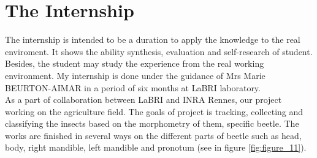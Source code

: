 \section{The Internship}
The internship is intended to be a duration to apply the knowledge to the real enviroment. It shows the ability synthesis, evaluation and self-research of student. Besides, the student may study the experience from the real working environment. My internship is done under the guidance of Mrs Marie BEURTON-AIMAR in a period of six months at LaBRI laboratory.\\[0.2cm]
As a part of collaboration between LaBRI and INRA Rennes, our project working on the agriculture field. The goals of project is tracking, collecting and classifying the insects based on the morphometry of them, specific beetle. The works are finished in several ways on the different parts of beetle such as head, body, right mandible, left mandible and pronotum (see in figure \ref{fig:figure_11}). 

